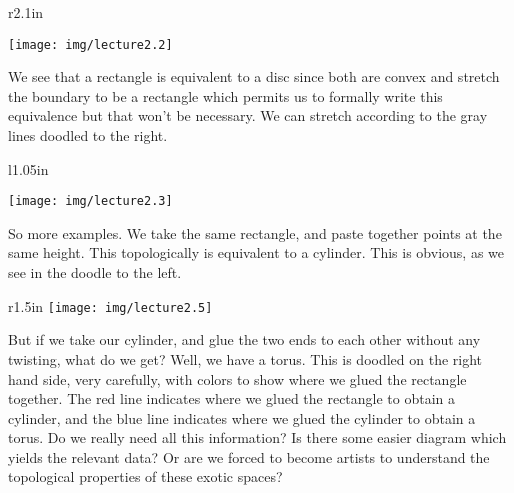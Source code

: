 \begin{wrapfigure}{r}{2.1in}
  \vspace{-30pt}
  \begin{center}
    \texttt{[image: img/lecture2.2]}
  \end{center}
  \vspace{-20pt}
\end{wrapfigure}
We see that a rectangle is equivalent to a disc since both are
convex and stretch the boundary to be a rectangle which permits
us to formally write this equivalence but that won't be necessary.
We can stretch according to the gray lines doodled to the right.

\begin{wrapfigure}{l}{1.05in}
  \vspace{-25pt}
  \begin{center}
    \texttt{[image: img/lecture2.3]}
  \end{center}
  \vspace{-23pt}
\end{wrapfigure}
So more examples. We take the same rectangle, and paste together
points at the same height. This topologically is equivalent to a
cylinder. This is obvious, as we see in the doodle to the left.


\begin{wrapfigure}{r}{1.5in}
  \vspace{-16pt}
    \texttt{[image: img/lecture2.5]}
  \vspace{-20pt}
\end{wrapfigure}
But if we take our cylinder, and glue the two ends to each other
without any twisting, what do we get? Well, we have a torus. This
is doodled on the right hand side, very carefully, with colors to
show where we glued the rectangle together.
The red line indicates where we glued the rectangle to obtain a
cylinder, and the blue line indicates where we glued the cylinder
to obtain a torus. Do we really need all this information? Is
there some easier diagram which yields the relevant data? Or are
we forced to become artists to understand the topological
properties of these exotic spaces?


